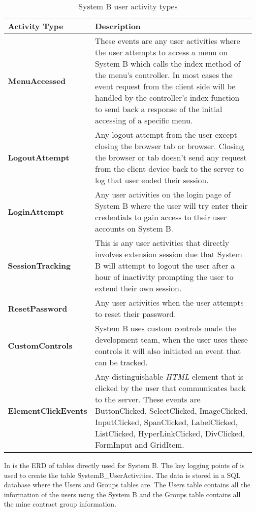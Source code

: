 \begin{table}[!htb]
	\centering
	\small
	\caption[System B user activity types]
	{System B user activity types}
	\label{tbl:Ch2_SystemB_ActivityTypes}
	\begin{tabularx}{\textwidth}{|l|X|}
		\hline \textbf{Activity Type} & \textbf{Description} \\
		\hline \textbf{MenuAccessed} & These events are any user activities where the user attempts to access a menu on System B which calls the index method of the menu's controller. In most cases the event request from the client side will be handled by the controller's index function to send back a response of the initial accessing of a specific menu. \\
		\hline \textbf{LogoutAttempt} & Any logout attempt from the user except closing the browser tab or browser. Closing the browser or tab doesn't send any request from the client device back to the server to log that user ended their session. \\
		\hline \textbf{LoginAttempt} & Any user activities on the login page of System B where the user will try enter their credentials to gain access to their user accounts on System B.\\
		\hline \textbf{SessionTracking} & This is any user activities that directly involves extension session due that System B will attempt to logout the user after a hour of inactivity prompting the user to extend their own session.\\
		\hline \textbf{ResetPassword} & Any user activities when the user attempts to reset their password. \\
		\hline \textbf{CustomControls} & System B uses custom controls made the development team, when the user uses these controls it will also initiated an event that can be tracked. \\ 
		\hline \textbf{ElementClickEvents} & Any distinguishable \emph{HTML} element that is clicked by the user that communicates back to the server. These events are ButtonClicked, SelectClicked, ImageClicked, InputClicked, SpanClicked, LabelClicked, ListClicked, HyperLinkClicked, DivClicked, FormInput and GridItem.\\
		\hline
	\end{tabularx}
\end{table}

In  is the ERD of tables directly used for System B. The key logging points of  is used to create the table SystemB\_UserActivities. The data is stored in a SQL database where the Users and Groups tables are. The Users table contains all the information of the users using the System B and the Groups table contains all the mine contract group information. 

